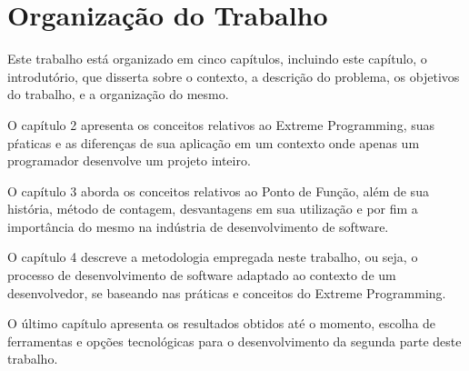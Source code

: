 \section{Organização do Trabalho}

Este trabalho está organizado em cinco capítulos, incluindo este capítulo, o
introdutório, que disserta sobre o contexto, a descrição do problema, os
objetivos do trabalho, e a organização do mesmo.

O capítulo 2 apresenta os conceitos relativos ao Extreme Programming, suas
pŕaticas e as diferenças de sua aplicação em um contexto onde apenas um
programador desenvolve um projeto inteiro.

O capítulo 3 aborda os conceitos relativos ao Ponto de Função, além de sua história, método de contagem, desvantagens em sua utilização e por fim  a
importância do mesmo na indústria de desenvolvimento de software.

O capítulo 4 descreve a metodologia empregada neste trabalho, ou seja,
o processo de desenvolvimento de software adaptado ao contexto de um
desenvolvedor, se baseando nas práticas e conceitos do Extreme Programming.

O último capítulo apresenta os resultados obtidos até o momento, escolha de
ferramentas e opções tecnológicas para o desenvolvimento da segunda parte deste
trabalho.
